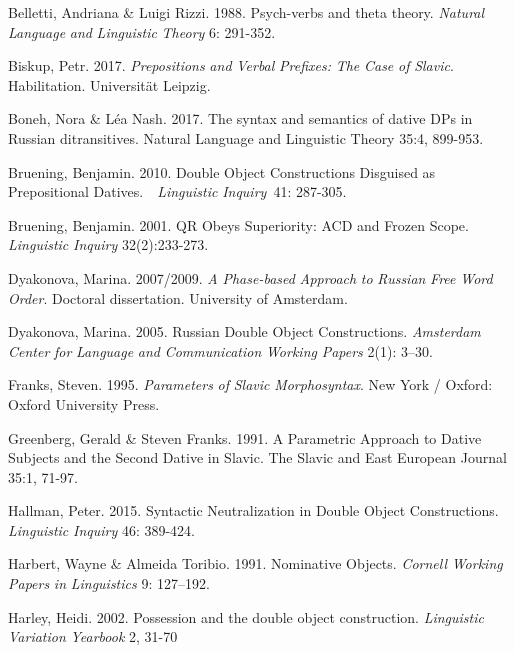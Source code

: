 \documentclass[output=paper,modfonts, nonflat]{langsci/langscibook}
\begin{document}
\begin{styleinnerExample}
\begin{styleNormalWeb}
Belletti, Andriana \& Luigi Rizzi. 1988. Psych-verbs and theta theory. \textit{Natural} \textit{Language} \textit{and} \textit{Linguistic} \textit{Theory} 6: 291-352. 
\end{styleNormalWeb}

\begin{styleNormalWeb}
Biskup, Petr. 2017. \textit{Prepositions} \textit{and} \textit{Verbal} \textit{Prefixes:} \textit{The} \textit{Case} \textit{of} \textit{Slavic}. Habilitation. Universität Leipzig.
\end{styleNormalWeb}

\begin{styleNormalWeb}
Boneh, Nora \& Léa Nash. 2017. The syntax and semantics of dative DPs in Russian ditransitives. Natural Language and Linguistic Theory 35:4, 899-953.
\end{styleNormalWeb}

Bruening, Benjamin. 2010. Double Object Constructions Disguised as Prepositional Datives.~~\textit{Linguistic} \textit{Inquiry}~41: 287-305.

Bruening, Benjamin. 2001. QR Obeys Superiority: ACD and Frozen Scope. \textit{Linguistic} \textit{Inquiry}  32(2):233-273.

Dyakonova, Marina. 2007/2009. \textit{A} \textit{Phase-based} \textit{Approach} \textit{to} \textit{Russian} \textit{Free} \textit{Word} \textit{Order}. Doctoral dissertation. University of Amsterdam. 

Dyakonova, Marina. 2005. Russian Double Object Constructions. \textit{Amsterdam} \textit{Center} \textit{for} \textit{Language} \textit{and} \textit{Communication} \textit{Working} \textit{Papers} 2(1): 3–30. 

Franks, Steven. 1995. \textit{Parameters} \textit{of} \textit{Slavic} \textit{Morphosyntax}. New York / Oxford: Oxford University Press.

Greenberg, Gerald \& Steven Franks. 1991. A Parametric Approach to Dative Subjects and the Second Dative in Slavic. The Slavic and East European Journal 35:1, 71-97.

Hallman, Peter. 2015. Syntactic Neutralization in Double Object Constructions. \textit{Linguistic} \textit{Inquiry} 46: 389-424.

Harbert, Wayne \& Almeida Toribio. 1991. Nominative Objects. \textit{Cornell} \textit{Working} \textit{Papers} \textit{in} \textit{Linguistics} 9: 127–192. 

Harley, Heidi. 2002. Possession and the double object construction. \textit{Linguistic} \textit{Variation} \textit{Yearbook} 2, 31-70


\end{styleinnerExample}
\end{document}
